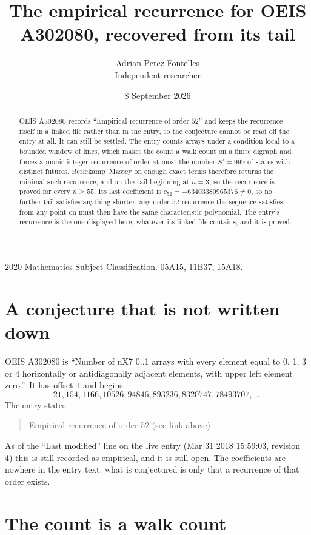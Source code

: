 \documentclass[11pt,a4paper]{article}
\title{The empirical recurrence for OEIS A302080, recovered from its tail}
\author{Adrian Perez Fontelles\\ \small Independent researcher}
\date{8 September 2026}
\theoremstyle{plain}
\theoremstyle{definition}
\begin{document}
\maketitle

\begin{abstract}
OEIS A302080 records ``Empirical recurrence of order $52$'' and keeps the recurrence itself in
a linked file rather than in the entry, so the conjecture cannot be read off the entry at all.
It can still be settled. The entry counts arrays under a condition local to a bounded window of
lines, which makes the count a walk count on a finite digraph and forces a monic integer
recurrence of order at most the number $S'=999$ of states with distinct futures. Berlekamp--Massey on
enough exact terms therefore returns the minimal such recurrence, and on the tail beginning at $n=3$, so the recurrence is proved for every $n\ge55$.
Its last coefficient is $c_{52}=-63403380965376\neq0$, so no further tail satisfies anything
shorter; any order-$52$ recurrence the sequence satisfies from any point on must then have
the same characteristic polynomial. The entry's recurrence is the one displayed here, whatever
its linked file contains, and it is proved.
\end{abstract}

\noindent\small 2020 Mathematics Subject Classification. 05A15, 11B37, 15A18.\normalsize

\section{A conjecture that is not written down}

OEIS A302080 is ``Number of nX7 0..1 arrays with every element equal to 0, 1, 3 or 4 horizontally or antidiagonally adjacent elements, with upper left element zero.''. It has offset $1$ and begins
\[
21, 154, 1166, 10526, 94846, 893236, 8320747, 78493707,\ \dots
\]
The entry states:
\begin{quote}
Empirical recurrence of order 52 (see link above)
\end{quote}
As of the ``Last modified'' line on the live entry (Mar 31 2018 15:59:03, revision 4)
this is still recorded as empirical, and it is still open. The coefficients are nowhere in the
entry text: what is conjectured is only that a recurrence of that order exists.

\section{The count is a walk count}
\end{document}
